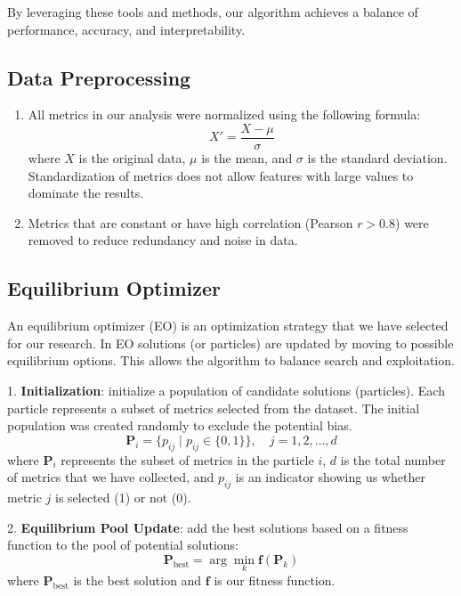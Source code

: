 \documentclass{styles/svproc}
\begin{document}
By leveraging these tools and methods, our algorithm achieves a balance of performance, accuracy, and interpretability.

\subsection{Data Preprocessing}\label{data-preprocessing}

\begin{enumerate}
    \def\labelenumi{\arabic{enumi}.}
    \item All metrics in our analysis were normalized using the following formula:
      \[
      X' = \frac{X - \mu}{\sigma}
      \]
      where \( X \) is the original data, \( \mu \) is the mean, and \( \sigma \) is the standard deviation. Standardization of metrics does not allow features with large values to dominate the results.
    \item Metrics that are constant or have high correlation (Pearson \( r > 0.8 \)) \cite{liu2016feature} were removed to reduce redundancy and noise in data. 
\end{enumerate}

\subsection{Equilibrium Optimizer}\label{equilibrium-optimizer-eo}

An equilibrium optimizer (EO) is an optimization strategy that we have selected for our research. In EO solutions (or particles) are updated by moving to possible equilibrium options. This allows the algorithm to balance search and exploitation.

1. \textbf{Initialization}: initialize a population of candidate solutions (particles). Each particle represents a subset of metrics selected from the dataset. The initial population was created randomly to exclude the potential bias.
   \[
   \mathbf{P}_i = \{p_{ij} \mid p_{ij} \in \{0, 1\}\}, \quad j = 1, 2, \dots, d
   \]
   where \( \mathbf{P}_i \) represents the subset of metrics in the particle \( i \), \( d \) is the total number of metrics that we have collected, and \( p_{ij} \) is an indicator showing us whether metric \( j \) is selected (1) or not (0).

2. \textbf{Equilibrium Pool Update}: add the best solutions based on a fitness function to the pool of potential solutions:
   \[
   \mathbf{P}_{\text{best}} = \arg\min_{k} \mathbf{f}(\mathbf{P}_k)
   \]
   where \( \mathbf{P}_{\text{best}} \) is the best solution and \( \mathbf{f} \) is our fitness function.
\end{document}
